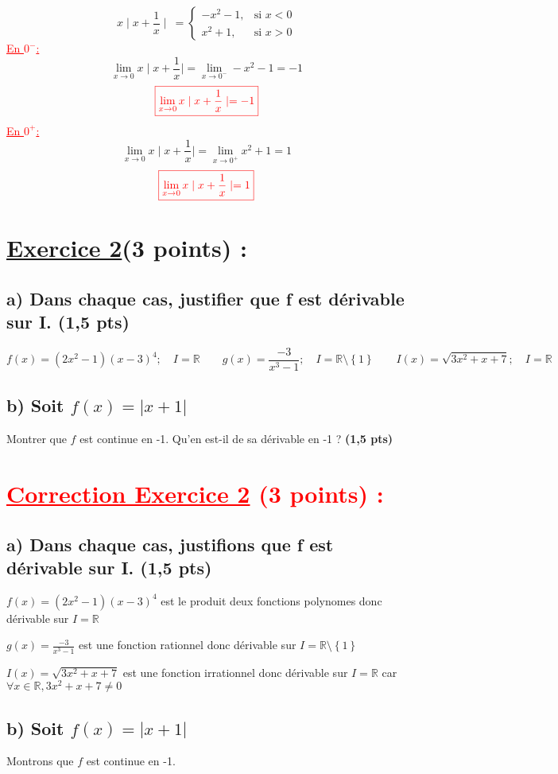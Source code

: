 \documentclass[12pt]{article}
\begin{document}
\[ x\mid x+\frac{1}{x}\mid\ = \begin{cases} 
  -x^{2}-1, & \text{si } x < 0 \\
  x^{2}+1, & \text{si } x > 0
\end{cases} \]
\textcolor{red}{\underline{En $0^{-}$:}}
\[\lim_{x \to 0}x\mid x+\frac{1}{x}\mid=\lim_{x \to 0^{-}}-x^{2}-1=-1\]
\[\textcolor{red}{\boxed{\lim_{x \to 0}x\mid x+\frac{1}{x}\mid=-1}}\]
\textcolor{red}{\underline{En $0^{+}$:}}
\[\lim_{x \to 0}x\mid x+\frac{1}{x}\mid=\lim_{x \to 0^{+}}x^{2}+1=1\]
\[\textcolor{red}{\boxed{\lim_{x \to 0}x\mid x+\frac{1}{x}\mid=1}}\]
\section*{\underline{Exercice 2}(3 points) :}
\subsection*{a) Dans chaque cas, justifier que f est dérivable sur I. (1,5 pts)}
\[f(x)=(2x^{2}-1)(x-3)^{4};\quad I=\mathbb{R}\quad\quad g(x)=\frac{-3}{x^{3}-1};\quad I=\mathbb{R}\setminus\left\lbrace 1 \right\rbrace \quad\quad I(x)=\sqrt{3x^{2}+x+7};\quad I=\mathbb{R}\]
\subsection*{b) Soit $f(x)=|x+1|$ }
Montrer que $f$ est continue en -1. Qu'en est-il de sa dérivable en -1 ? \textbf{(1,5 pts)}
\section*{\textcolor{red}{\underline{Correction Exercice 2} (3 points) :}}
\subsection*{a) Dans chaque cas, justifions que f est dérivable sur I. (1,5 pts)}
$f(x)=(2x^{2}-1)(x-3)^{4}$ est le produit deux fonctions polynomes donc dérivable sur $I=\mathbb{R}$

$g(x)=\frac{-3}{x^{3}-1}$ est une fonction rationnel donc dérivable sur $I=\mathbb{R}\setminus\left\lbrace 1 \right\rbrace$

$I(x)=\sqrt{3x^{2}+x+7}$ est une fonction irrationnel donc dérivable sur $I=\mathbb{R}$ car\\ $\forall x\in \mathbb{R}, 3x^{2}+x+7\neq 0$
\subsection*{b) Soit $f(x)=|x+1|$ }
Montrons que $f$ est continue en -1.
\end{document}
